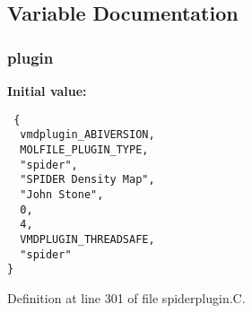 \subsection{Variable Documentation}
\subsubsection{ plugin\hspace{0.3cm}{\tt  [static]}}\label{spiderplugin_8C_a1}


{\bf Initial value:}

\footnotesize\begin{verbatim} {
  vmdplugin_ABIVERSION,   
  MOLFILE_PLUGIN_TYPE,    
  "spider",               
  "SPIDER Density Map",   
  "John Stone",           
  0,                      
  4,                      
  VMDPLUGIN_THREADSAFE,   
  "spider"                
}\end{verbatim}\normalsize 


Definition at line 301 of file spiderplugin.C.